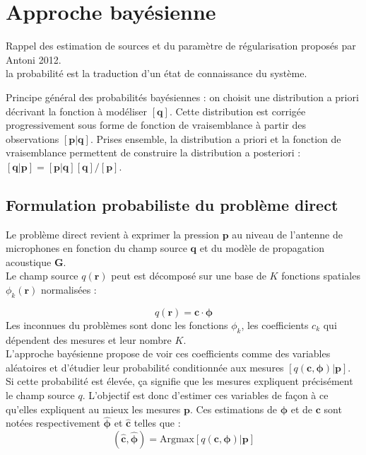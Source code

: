 \section{Approche bayésienne}

Rappel des estimation de sources et du paramètre de régularisation proposés par Antoni 2012.\\

la probabilité est la traduction d'un état de connaissance du système.


Principe général des probabilités bayésiennes : on choisit une distribution a priori décrivant la fonction à modéliser $[\bm{q}]$. Cette distribution est corrigée progressivement sous forme de fonction de vraisemblance à partir des observations $[\bm{p|q}]$. Prises ensemble, la distribution a priori et la fonction de vraisemblance permettent de construire la distribution a posteriori : $[\bm{q|p}] = [\bm{p|q}][\bm{q}]/[\bm{p}]$.

\subsection{Formulation probabiliste du problème direct}

Le problème direct revient à exprimer la pression $\bm{p}$ au niveau de l'antenne de microphones en fonction du champ source $\bm{q}$ et du modèle de propagation acoustique $\bm{G}$.\\
Le champ source $q(\bm{r})$ peut est décomposé sur une base de $K$ fonctions spatiales $\phi_k(\bm{r})$ normalisées :

\begin{equation}
q(\bm{r}) = \bm{c} \cdot \bm{\phi}
\end{equation}
Les inconnues du problèmes sont donc les fonctions $\phi_k$, les coefficients $c_k$ qui dépendent des mesures et leur nombre $K$.\\

L'approche bayésienne propose de voir ces coefficients comme des variables aléatoires et d'étudier leur probabilité conditionnée aux mesures $[q(\bm{c},\bm{\phi})|\bm{p}]$. Si cette probabilité est élevée, ça signifie que les mesures expliquent précisément le champ source $q$. L'objectif est donc d'estimer ces variables de façon à ce qu'elles expliquent au mieux les mesures $\bm{p}$. Ces estimations de $\bm{\phi}$ et de $\bm{c}$ sont notées respectivement $\bm{\hat{\phi}}$ et $\bm{\hat{c}}$ telles que : 
\begin{equation}
	(\bm{\hat{c}},\bm{\hat{\phi}}) = \text{Argmax}[q(\bm{c},\bm{\phi})|\bm{p}]
\end{equation}

